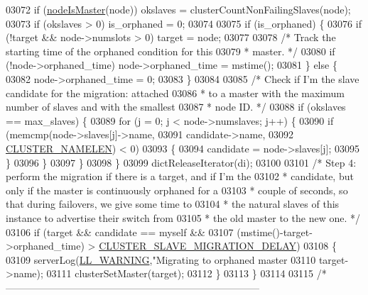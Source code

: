 \begin{DoxyCode}
{{{{{{{{{{{{{{{{{{{{{{{{{{{{{{{{{{{{{{{{{{{{{{{{{{{{{{{{03072         \textcolor{keywordflow}{if} (\hyperlink{cluster_8h_a2d8e84269474d8750565fb3fb67aa436}{nodeIsMaster}(node)) okslaves = clusterCountNonFailingSlaves(node);
03073         \textcolor{keywordflow}{if} (okslaves > 0) is\_orphaned = 0;
03074 
03075         \textcolor{keywordflow}{if} (is\_orphaned) \{
03076             \textcolor{keywordflow}{if} (!target && node->numslots > 0) target = node;
03077 
03078             \textcolor{comment}{/* Track the starting time of the orphaned condition for this}
03079 \textcolor{comment}{             * master. */}
03080             \textcolor{keywordflow}{if} (!node->orphaned\_time) node->orphaned\_time = mstime();
03081         \} \textcolor{keywordflow}{else} \{
03082             node->orphaned\_time = 0;
03083         \}
03084 
03085         \textcolor{comment}{/* Check if I'm the slave candidate for the migration: attached}
03086 \textcolor{comment}{         * to a master with the maximum number of slaves and with the smallest}
03087 \textcolor{comment}{         * node ID. */}
03088         \textcolor{keywordflow}{if} (okslaves == max\_slaves) \{
03089             \textcolor{keywordflow}{for} (j = 0; j < node->numslaves; j++) \{
03090                 \textcolor{keywordflow}{if} (memcmp(node->slaves[j]->name,
03091                            candidate->name,
03092                            \hyperlink{cluster_8h_ace7a882972eff7149675252938643b6e}{CLUSTER\_NAMELEN}) < 0)
03093                 \{
03094                     candidate = node->slaves[j];
03095                 \}
03096             \}
03097         \}
03098     \}
03099     dictReleaseIterator(di);
03100 
03101     \textcolor{comment}{/* Step 4: perform the migration if there is a target, and if I'm the}
03102 \textcolor{comment}{     * candidate, but only if the master is continuously orphaned for a}
03103 \textcolor{comment}{     * couple of seconds, so that during failovers, we give some time to}
03104 \textcolor{comment}{     * the natural slaves of this instance to advertise their switch from}
03105 \textcolor{comment}{     * the old master to the new one. */}
03106     \textcolor{keywordflow}{if} (target && candidate == myself &&
03107         (mstime()-target->orphaned\_time) > \hyperlink{cluster_8h_a6379f60d426f37f755440776cb9cc88e}{CLUSTER\_SLAVE\_MIGRATION\_DELAY})
03108     \{
03109         serverLog(\hyperlink{server_8h_a31229b9334bba7d6be2a72970967a14b}{LL\_WARNING},\textcolor{stringliteral}{"Migrating to orphaned master %
03110             target->name);
03111         clusterSetMaster(target);
03112     \}
03113 \}
03114 
03115 \textcolor{comment}{/* -----------------------------------------------------------------------------}
}}}}}}}}}}}}}}}}}}}}}}}}}}}}}}}}}}}}}}}}}}}}}}}}}}}}}}}}}
\end{DoxyCode}
